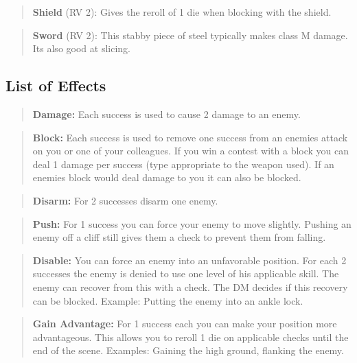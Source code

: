 \documentclass[11pt]{article}
\begin{document}
{\begin{multicols}{2}[]
\begin{quote}
\textbf{Shield} (RV 2): Gives the reroll of 1 die when blocking with the shield.
\end{quote}

\begin{quote}
\textbf{Sword} (RV 2): This stabby piece of steel typically makes class M damage. Its also good at slicing.
\end{quote}

\subsection{List of Effects}
\label{sec:org81489f8}
\begin{quote}
\textbf{Damage:} Each success is used to cause 2 damage to an enemy.
\end{quote}

\begin{quote}
\textbf{Block:} Each success is used to remove one success from an enemies attack on you or one of your colleagues. If you win a contest with a block you can deal 1 damage per success (type appropriate to the weapon used). If an enemies block would deal damage to you it can also be blocked.
\end{quote}

\begin{quote}
\textbf{Disarm:} For 2 successes disarm one enemy.
\end{quote}

\begin{quote}
\textbf{Push:} For 1 success you can force your enemy to move slightly. Pushing an enemy off a cliff still gives them a check to prevent them from falling.
\end{quote}

\begin{quote}
\textbf{Disable:} You can force an enemy into an unfavorable position. For each 2 successes the enemy is denied to use one level of his applicable skill. The enemy can recover from this with a check. The DM decides if this recovery can be blocked. Example: Putting the enemy into an ankle lock.
\end{quote}

\begin{quote}
\textbf{Gain Advantage:} For 1 success each you can make your position more advantageous. This allows you to reroll 1 die on applicable checks until the end of the scene. Examples: Gaining the high ground, flanking the enemy.
\end{quote}


\end{multicols}}
\end{document}
